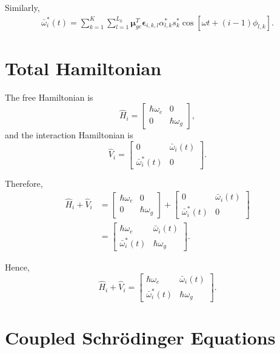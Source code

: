 \documentclass[12pt,a4paper]{article}
\begin{document}
Similarly,
\[
\begin{aligned}
\bar{\omega}_i^{*}(t)
=
\sum_{k=1}^{K}
\sum_{l=1}^{L_k}
\boldsymbol{\mu}_{ge}^{T}
\boldsymbol{\epsilon}_{i,k,l}
\alpha_{l,k}^{*}s_k^{*}
\cos
\left[
\omega t+(i-1)\phi_{l,k}
\right].
\end{aligned}
\]


\section{Total Hamiltonian}

The free Hamiltonian is
\[
\hat H_i
=
\begin{bmatrix}
\hbar\omega_e&0\\
0&\hbar\omega_g
\end{bmatrix},
\]
and the interaction Hamiltonian is
\[
\hat V_i
=
\begin{bmatrix}
0&\bar{\omega}_i(t)\\
\bar{\omega}_i^{*}(t)&0
\end{bmatrix}.
\]

Therefore,
\[
\begin{aligned}
\hat H_i+\hat V_i
&=
\begin{bmatrix}
\hbar\omega_e&0\\
0&\hbar\omega_g
\end{bmatrix}
+
\begin{bmatrix}
0&\bar{\omega}_i(t)\\
\bar{\omega}_i^{*}(t)&0
\end{bmatrix}\\
&=
\begin{bmatrix}
\hbar\omega_e&\bar{\omega}_i(t)\\
\bar{\omega}_i^{*}(t)&\hbar\omega_g
\end{bmatrix}.
\end{aligned}
\]

Hence,
\begin{equation}
\boxed{
\hat H_i+\hat V_i
=
\begin{bmatrix}
\hbar\omega_e&\bar{\omega}_i(t)\\
\bar{\omega}_i^{*}(t)&\hbar\omega_g
\end{bmatrix}.
}
\tag{27}
\end{equation}


\section{Coupled Schr\"odinger Equations}
\end{document}
